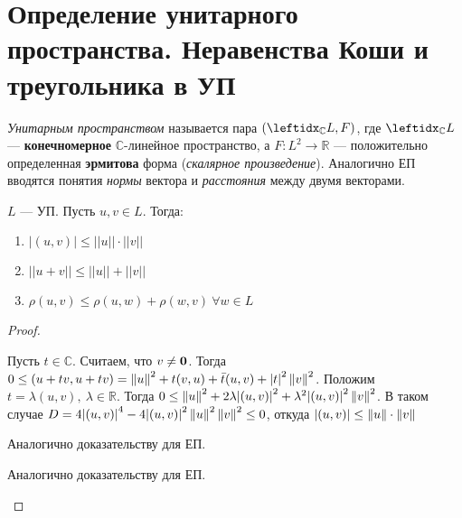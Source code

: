 \section{Определение унитарного пространства. Неравенства Коши и треугольника в УП}

\begin{defn}
    \textit{Унитарным пространством} называется пара $(\lsub{\mathbb{C}}{L}, F)$, где $\lsub{\mathbb{C}}{L}$ --- \textbf{конечномерное} $\mathbb{C}$-линейное пространство, а $F \colon L^2 \to \mathbb{R}$ --- положительно определенная \textbf{эрмитова} форма (\textit{скалярное произведение}).
    Аналогично ЕП вводятся понятия \textit{нормы} вектора и \textit{расстояния} между двумя векторами.
\end{defn}

\begin{thm*}
    $L$ --- УП. Пусть $u, v \in L$. Тогда:
    \begin{enumerate}
        \item $|(u, v)| \le ||u|| \cdot ||v||$
        \item $||u + v|| \le ||u|| + ||v||$
        \item $\rho(u, v) \le \rho(u, w) + \rho(w, v)\ \forall w \in L$
    \end{enumerate}
\end{thm*}

\begin{proof}
    \begin{proofpart}
        Пусть $t \in \mathbb{C}$. Считаем, что $v \neq \mathbf{0}$. Тогда $0 \le (u + tv, u + tv) = \left\lVert u\right\rVert^2 + t(v, u) + \bar{t}(u, v) + {|t|}^2\left\lVert v\right\rVert^2$. Положим $t = \lambda(u, v),\ \lambda \in \mathbb{R}$. Тогда $0 \le \left\lVert u\right\rVert^2 + 2\lambda{|(u, v)|}^2 + \lambda^2 {|(u, v)|}^2 \left\lVert v\right\rVert^2$. В таком случае $D = 4{|(u, v)|}^4 - 4{|(u, v)|}^2\left\lVert u\right\rVert^2\left\lVert v\right\rVert^2 \le 0$, откуда $|(u, v)| \le \left\lVert u\right\rVert \cdot \left\lVert v\right\rVert$
    \end{proofpart}
    
    \begin{proofpart}
        Аналогично доказательству для ЕП.
    \end{proofpart}
    
    \begin{proofpart}
        Аналогично доказательству для ЕП.
    \end{proofpart}
\end{proof}